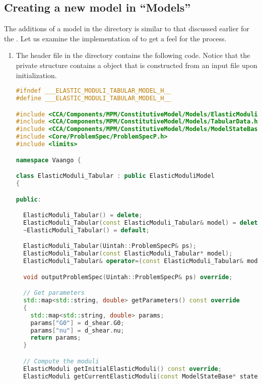 \subsection{Creating a new model in ``Models''}
The additions of a model in the  directory is similar to that discussed
earlier for the .  Let us examine the implementation
of  to get a feel for the process. 
\begin{enumerate}
  \item The header file  in the 
        directory contains the following code.  Notice that the private structure
         contains a  object that
        is constructed from an input file upon initialization.
\begin{lstlisting}[language=Cpp]
#ifndef ___ELASTIC_MODULI_TABULAR_MODEL_H__
#define ___ELASTIC_MODULI_TABULAR_MODEL_H__

#include <CCA/Components/MPM/ConstitutiveModel/Models/ElasticModuliModel.h>
#include <CCA/Components/MPM/ConstitutiveModel/Models/TabularData.h>
#include <CCA/Components/MPM/ConstitutiveModel/Models/ModelStateBase.h>
#include <Core/ProblemSpec/ProblemSpecP.h>
#include <limits>

namespace Vaango {

class ElasticModuli_Tabular : public ElasticModuliModel
{

public:

  ElasticModuli_Tabular() = delete;
  ElasticModuli_Tabular(const ElasticModuli_Tabular& model) = delete;
  ~ElasticModuli_Tabular() = default;

  ElasticModuli_Tabular(Uintah::ProblemSpecP& ps);
  ElasticModuli_Tabular(const ElasticModuli_Tabular* model);
  ElasticModuli_Tabular& operator=(const ElasticModuli_Tabular& model) = delete;

  void outputProblemSpec(Uintah::ProblemSpecP& ps) override;

  // Get parameters 
  std::map<std::string, double> getParameters() const override
  {
    std::map<std::string, double> params;
    params["G0"] = d_shear.G0;
    params["nu"] = d_shear.nu;
    return params;
  }

  // Compute the moduli
  ElasticModuli getInitialElasticModuli() const override;
  ElasticModuli getCurrentElasticModuli(const ModelStateBase* state) override;


\end{lstlisting}
\end{enumerate}
